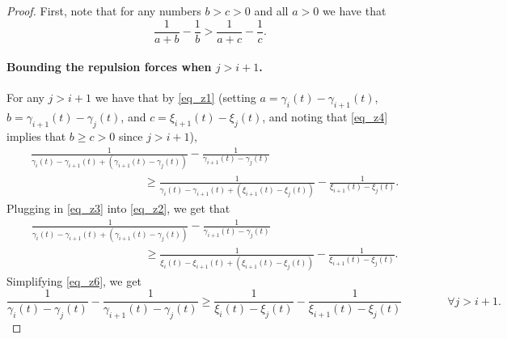 \documentclass[11pt,letterpaper]{article}
\begin{document}
\begin{proof}
%
First, note that for any numbers $b > c >0$ and all $a >0$ we have that
%
\begin{equation} \label{eq_z1}
\frac{1}{a+b} - \frac{1}{b} > \frac{1}{a+c} - \frac{1}{c}.
\end{equation}


\paragraph{Bounding the repulsion forces when  $j > i+1$.}
For any $j > i+1$ we have that by \eqref{eq_z1} (setting $a=\gamma_i(t) - \gamma_{i+1}(t)$,  $b=\gamma_{i+1}(t) - \gamma_j(t)$, and $c=\xi_{i+1}(t) - \xi_j(t)$,  and noting that \eqref{eq_z4} implies that $b \geq c >0$ since $j > i+1$),
%
\begin{align} \label{eq_z2}
&\frac{1}{\gamma_i(t) - \gamma_{i+1}(t) +(\gamma_{i+1}(t) - \gamma_j(t))} - \frac{1}{\gamma_{i+1}(t) - \gamma_j(t)} \nonumber\\
%
& \qquad \qquad \qquad  \qquad \qquad \geq \frac{1}{\gamma_i(t) - \gamma_{i+1}(t) +(\xi_{i+1}(t) - \xi_j(t))} - \frac{1}{\xi_{i+1}(t) - \xi_j(t)}.
\end{align}
%
Plugging in \eqref{eq_z3} into \eqref{eq_z2}, we get that
%
\begin{align} \label{eq_z6}
&\frac{1}{\gamma_i(t) - \gamma_{i+1}(t) +(\gamma_{i+1}(t) - \gamma_j(t))} - \frac{1}{\gamma_{i+1}(t) - \gamma_j(t)}\nonumber\\
%
& \qquad \qquad \qquad  \qquad \qquad \geq \frac{1}{\xi_i(t) - \xi_{i+1}(t) +(\xi_{i+1}(t) - \xi_j(t))} - \frac{1}{\xi_{i+1}(t) - \xi_j(t)}.
\end{align}
%
Simplifying \eqref{eq_z6}, we get
%
\begin{equation} \label{eq_z7}
\frac{1}{\gamma_i(t) - \gamma_j(t)} - \frac{1}{\gamma_{i+1}(t) - \gamma_j(t)} \geq \frac{1}{\xi_i(t) - \xi_j(t)} - \frac{1}{\xi_{i+1}(t) - \xi_j(t)} \qquad \qquad \forall j > i+1.
\end{equation}



\end{proof}
\end{document}

